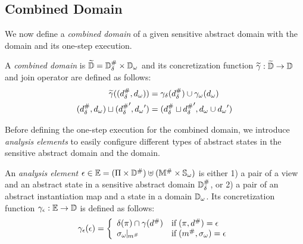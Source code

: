 \subsection{Combined Domain}
We now define a \textit{combined domain} of a given sensitive abstract
domain with the {\sealed} domain and its one-step execution.
\begin{definition}
  A \textit{combined domain} is $\widetilde{\mathbb{D}} = {\mathbb{D}}^{\#}_\delta \times {\mathbb{D}}_\omega$ and its
  concretization function $\widetilde{\gamma}: \widetilde{\mathbb{D}} \rightarrow \mathbb{D}$ and join
  operator are defined as follows:
  \begin{align}
    \widetilde{\gamma}(({{d}^{\#}_\delta}, {{d}_\omega})) &= \gamma_\delta({{d}^{\#}_\delta}) \cup
      {\gamma}_\omega({{d}_\omega})\\
    ({{d}^{\#}_\delta}, {{d}_\omega}) \sqcup ({{{d}^{\#}_\delta}}', {{d}_\omega}') &= ({{d}^{\#}_\delta} \sqcup
      {{{d}^{\#}_\delta}}', {{d}_\omega} \cup {{d}_\omega}')
  \end{align}
\end{definition}

Before defining the one-step execution for the combined domain, we introduce
\textit{analysis elements} to easily configure different types of abstract
states in the sensitive abstract domain and the {\sealed} domain.
\begin{definition}\label{def:aelem}
  An \textit{analysis element} $\epsilon \in \mathbb{E} = (\Pi \times {\mathbb{D}}^{\#})
  \uplus ({\mathbb{M}}^{\#} \times {\mathbb{S}}_\omega)$ is either 1) a pair of a view and an
  abstract state in a sensitive abstract domain ${\mathbb{D}}^{\#}_\delta$, or 2) a pair of an
  abstract instantiation map and a {\sealed} state in a {\sealed}
  domain ${\mathbb{D}}_\omega$.  Its concretization function $\gamma_{\epsilon}:
  \mathbb{E} \rightarrow \mathbb{D}$ is defined as follows:
  \[
    \gamma_{\epsilon}(\epsilon) = \left\{
      \begin{array}{ll}
        \delta(\pi) \cap \gamma({d}^{\#}) & \text{if} \; (\pi, {d}^{\#}) = \epsilon\\
        {\sigma}_\omega\!\!\mid\!\!_{{m}^{\#}} & \text{if} \; ({m}^{\#}, {\sigma}_\omega) = \epsilon\\
      \end{array}
    \right.
  \]
\end{definition}


